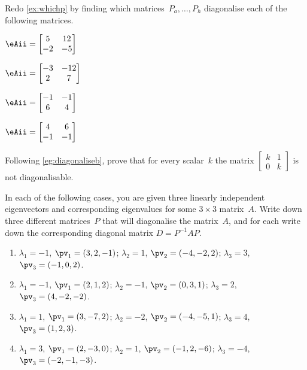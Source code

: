 \begin{exercise} \label{ex:whichps} 
Redo \autoref{ex:whichp} by finding which matrices~\(P_a,\ldots,P_h\) diagonalise each of the following matrices.
\begin{parts}
\item \(\eAii=\begin{bmatrix} 5&12\\-2&-5 \end{bmatrix}\)
\item \(\eAii=\begin{bmatrix} -3&-12\\2&7 \end{bmatrix}\)
\item \(\eAii=\begin{bmatrix} -1&-1\\6&4 \end{bmatrix}\)
\item \(\eAii=\begin{bmatrix} 4&6\\-1&-1 \end{bmatrix}\)
\end{parts}
\end{exercise}




\begin{exercise} \label{ex:} 
Following \autoref{eg:diagonaliseb}, prove that for every scalar~\(k\) the matrix \(\begin{bmatrix} k&1\\0&k \end{bmatrix}\) is not diagonalisable.
\end{exercise}




\begin{exercise} \label{ex:} 
In each of the following cases, you are given three linearly independent eigenvectors and corresponding eigenvalues for some \(3\times3\) matrix~\(A\).
Write down three different matrices~\(P\) that will diagonalise the matrix~\(A\), and for each write down the corresponding diagonal matrix \(D=P^{-1}AP\).
\begin{enumerate}
\item \(\lambda_1=-1\), \(\pv_1=(3,2,-1)\);
\(\lambda_2=1\), \(\pv_2=(-4,-2,2)\);
\(\lambda_3=3\), \(\pv_3=(-1,0,2)\).

\item \(\lambda_1=-1\), \(\pv_1=( 2,1,2)\);
\(\lambda_2=-1\), \(\pv_2=(0,3,1)\);
\(\lambda_3=2\), \(\pv_3=(4,-2,-2)\).

\item \(\lambda_1=1\), \(\pv_1=(3,-7,2)\);
\(\lambda_2=-2\), \(\pv_2=(-4,-5,1)\);
\(\lambda_3=4\), \(\pv_3=(1,2,3)\).

\item \(\lambda_1=3\), \(\pv_1=(2,-3,0)\);
\(\lambda_2=1\), \(\pv_2=(-1,2,-6)\);
\(\lambda_3=-4\), \(\pv_3=(-2,-1,-3)\).

\end{enumerate}
\end{exercise}





